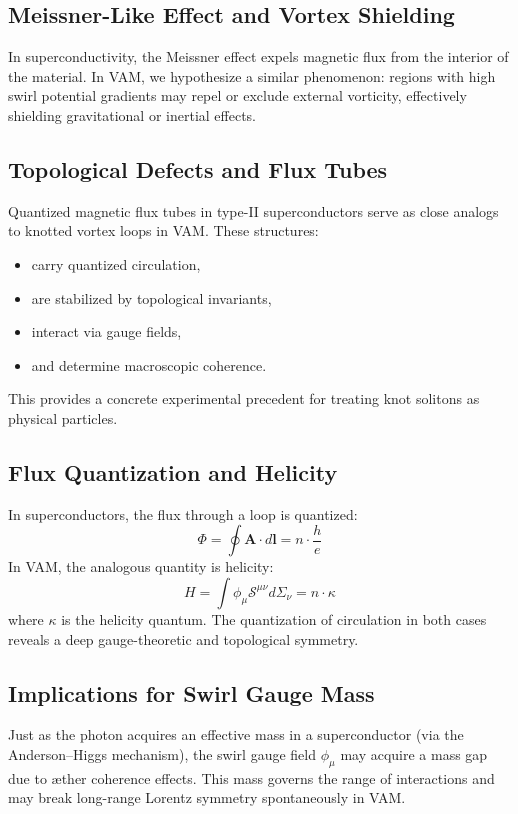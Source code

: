 \documentclass[a4paper,12pt]{article}
\begin{document}
        \subsection{Meissner-Like Effect and Vortex Shielding}
        In superconductivity, the Meissner effect expels magnetic flux from the interior of the material. In VAM, we hypothesize a similar phenomenon: regions with high swirl potential gradients may repel or exclude external vorticity, effectively shielding gravitational or inertial effects.

        \subsection{Topological Defects and Flux Tubes}
        Quantized magnetic flux tubes in type-II superconductors serve as close analogs to knotted vortex loops in VAM. These structures:
        \begin{itemize}
            \item carry quantized circulation,
            \item are stabilized by topological invariants,
            \item interact via gauge fields,
            \item and determine macroscopic coherence.
        \end{itemize}
        This provides a concrete experimental precedent for treating knot solitons as physical particles.

        \subsection{Flux Quantization and Helicity}
        In superconductors, the flux through a loop is quantized:
        \begin{equation}
            \Phi = \oint \mathbf{A} \cdot d\mathbf{l} = n \cdot \frac{h}{e}
        \end{equation}
        In VAM, the analogous quantity is helicity:
        \begin{equation}
            H = \int \phi_\mu \mathcal{S}^{\mu\nu} d\Sigma_\nu = n \cdot \kappa
        \end{equation}
        where $\kappa$ is the helicity quantum. The quantization of circulation in both cases reveals a deep gauge-theoretic and topological symmetry.

        \subsection{Implications for Swirl Gauge Mass}
        Just as the photon acquires an effective mass in a superconductor (via the Anderson–Higgs mechanism), the swirl gauge field $\phi_\mu$ may acquire a mass gap due to æther coherence effects. This mass governs the range of interactions and may break long-range Lorentz symmetry spontaneously in VAM.
\end{document}
